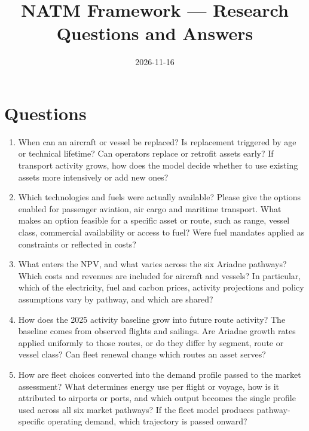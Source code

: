 \documentclass{article}
\title{NATM Framework --- Research Questions and Answers}
\date{2026-11-16}
\begin{document}
\maketitle

\section*{Questions}

\begin{enumerate}[leftmargin=*]
  \item When can an aircraft or vessel be replaced? Is replacement triggered
    by age or technical lifetime? Can operators replace or retrofit assets
    early? If transport activity grows, how does the model decide whether to
    use existing assets more intensively or add new ones?

  \item Which technologies and fuels were actually available? Please give
    the options enabled for passenger aviation, air cargo and maritime
    transport. What makes an option feasible for a specific asset or route,
    such as range, vessel class, commercial availability or access to fuel?
    Were fuel mandates applied as constraints or reflected in costs?

  \item What enters the NPV, and what varies across the six Ariadne
    pathways? Which costs and revenues are included for aircraft and
    vessels? In particular, which of the electricity, fuel and carbon
    prices, activity projections and policy assumptions vary by pathway, and
    which are shared?

  \item How does the 2025 activity baseline grow into future route
    activity? The baseline comes from observed flights and sailings. Are
    Ariadne growth rates applied uniformly to those routes, or do they
    differ by segment, route or vessel class? Can fleet renewal change which
    routes an asset serves?

  \item How are fleet choices converted into the demand profile passed to
    the market assessment? What determines energy use per flight or voyage,
    how is it attributed to airports or ports, and which output becomes the
    single profile used across all six market pathways? If the fleet model
    produces pathway-specific operating demand, which trajectory is passed
    onward?
\end{enumerate}
\end{document}
